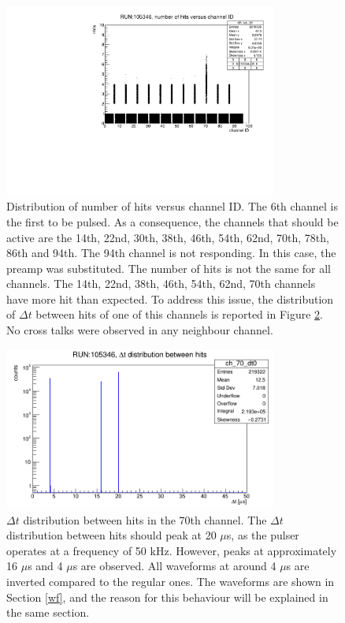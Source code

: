 \begin{figure}[!h]
  \centering
  \includegraphics[width=0.8\textwidth]{figures/pdf/run105346_nh_vs_ch.pdf}
  \caption{Distribution of number of hits versus channel ID. The 6th channel is the first to be pulsed.
  As a consequence, the channels that should be active are the 14th, 22nd, 30th, 38th, 46th, 54th, 62nd, 70th, 78th, 86th and 94th. 
  The 94th channel is not responding. In this case, the preamp was substituted.
  The number of hits is not the same for all channels. The 14th, 22nd, 38th, 46th, 54th, 62nd, 70th channels have more hit than expected.
  To address this issue, the distribution of $\Delta t$ between hits of one of this channels is reported in Figure \ref{fig:deltatnhits}.
  No cross talks were observed in any neighbour channel.}
 \label{fig:dead}
\end{figure}


\begin{figure}[!h]
  \centering
  \includegraphics[width=0.8\textwidth]{figures/png/deltathits.png}
  \caption{$\Delta t$ distribution between hits in the 70th channel. The $\Delta t$ distribution between hits 
  should peak at 20 $\mu$s, as the pulser operates at a frequency of 50 kHz. However, peaks at approximately 
  16 $\mu$s and 4 $\mu$s are observed. All waveforms at around 4 $\mu$s are inverted compared to the regular ones. 
  The waveforms are shown in Section \ref{wf}, and the reason for this behaviour will be explained in the same section.}
 \label{fig:deltatnhits}
\end{figure}

